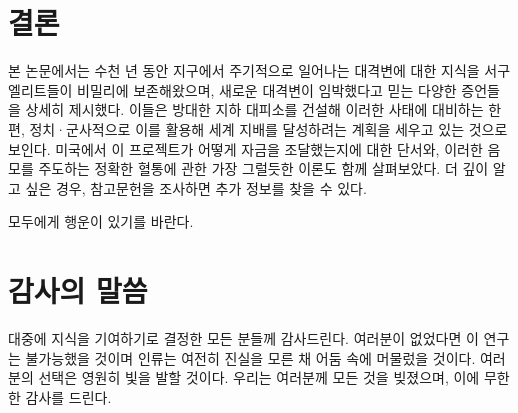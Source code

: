 \documentclass[10pt,twocolumn,letterpaper]{article}
\begin{document}
\section{결론}

본 논문에서는 수천 년 동안 지구에서 주기적으로 일어나는 대격변에 대한 지식을 서구 엘리트들이 비밀리에 보존해왔으며, 새로운 대격변이 임박했다고 믿는 다양한 증언들을 상세히 제시했다. 이들은 방대한 지하 대피소를 건설해 이러한 사태에 대비하는 한편, 정치·군사적으로 이를 활용해 세계 지배를 달성하려는 계획을 세우고 있는 것으로 보인다. 미국에서 이 프로젝트가 어떻게 자금을 조달했는지에 대한 단서와, 이러한 음모를 주도하는 정확한 혈통에 관한 가장 그럴듯한 이론도 함께 살펴보았다. 더 깊이 알고 싶은 경우, 참고문헌을 조사하면 추가 정보를 찾을 수 있다.

모두에게 행운이 있기를 바란다. 

\section{감사의 말씀}

대중에 지식을 기여하기로 결정한 모든 분들께 감사드린다. 여러분이 없었다면 이 연구는 불가능했을 것이며 인류는 여전히 진실을 모른 채 어둠 속에 머물렀을 것이다. 여러분의 선택은 영원히 빛을 발할 것이다. 우리는 여러분께 모든 것을 빚졌으며, 이에 무한한 감사를 드린다.

\clearpage
\twocolumn

{\small


}
\end{document}
